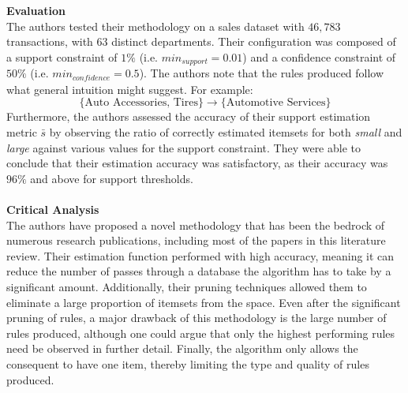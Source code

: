 \\\\\textbf{Evaluation}\\
The authors tested their methodology on a sales dataset with $46,783$ transactions, with $63$ distinct departments. Their configuration was composed of a support constraint of $1\%$ (i.e. $\textit{min}_\textit{support} = 0.01$) and a confidence constraint of $50\%$ (i.e. $\textit{min}_\textit{confidence} = 0.5$). The authors note that the rules produced follow what general intuition might suggest. For example:
\[
\{\text{Auto Accessories, Tires}\} \rightarrow \{\text{Automotive Services}\}
\]
Furthermore, the authors assessed the accuracy of their support estimation metric $\bar{s}$ by observing the ratio of correctly estimated itemsets for both \textit{small} and \textit{large} against various values for the support constraint. They were able to conclude that their estimation accuracy was satisfactory, as their accuracy was  $96\%$ and above for support thresholds.
\\\\\textbf{Critical Analysis}\\
The authors have proposed a novel methodology that has been the bedrock of numerous research publications,  including most of the papers in this literature review.  Their estimation function performed with high accuracy, meaning it can reduce the number of passes through a database the algorithm has to take by a significant amount. Additionally, their pruning techniques allowed them to eliminate a large proportion of itemsets from the space. Even after the significant pruning of rules, a major drawback of this methodology is the large number of rules produced, although one could argue that only the highest performing rules need be observed in further detail. Finally, the algorithm only allows the consequent to have one item, thereby limiting the type and quality of rules produced.

